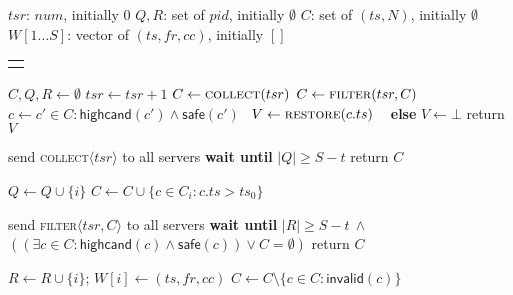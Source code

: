 \documentclass[10pt,conference,compsocconf]{IEEEtran}
\newcommand{\nonce}{N}
\begin{document}
\begin{algo}[t]
\small

\begin{distribalgo}[1] \setcounter{ALC@line}{\value{alg:client1:lines}}
\smallskip
{}
\STATE $tsr$: $num$, initially $0$
\STATE $Q,R$: set of $pid$, initially $\emptyset$
\STATE $C$: set of $(ts, \nonce)$, initially $\emptyset$
\STATE $W[1 \dots S]$: vector of $(ts,fr,cc)$, initially $[]$
\ENDINDENT

\setcounter{alg:client1:lines}{\value{ALC@line}}
\end{distribalgo}
\begin{tabular}{c}\hline\mbox{}\hspace{0.45\textwidth}\mbox{}\end{tabular}
\vspace{-2 em}
\begin{distribalgo}[1]   \setcounter{ALC@line}{\value{alg:client1:lines}}

\STATE $C,Q,R \leftarrow \emptyset$
\STATE $tsr \leftarrow tsr + 1$
\STATE $C \leftarrow \textsc{collect}(tsr)$
\STATE $C \leftarrow \textsc{filter}(tsr, C)$
\STATE $c \leftarrow c' \in C: \textsf{highcand}(c') \wedge \textsf{safe}(c')$~\label{alg:reader:select}
\STATE $V \leftarrow \textsc{restore}(c.ts)$ ~\label{alg:reader:restore}
\ENDIF
\STATE \textbf{else} $V \leftarrow \bot$
\STATE return $V$
\ENDINDENT

\medskip
{}
\STATE send \textsc{collect}$\langle tsr \rangle$ to all servers
\STATE \textbf{wait until} $|Q| \geq S-t$
\STATE return $C$
\ENDINDENT

\smallskip
{}
\STATE $Q \leftarrow Q \cup \{ i \}$
\STATE $C \leftarrow C \cup \{c \in C_i : c.ts > ts_0\}$
\ENDINDENT

\medskip
{}
\STATE send \textsc{filter}$\langle tsr, C \rangle$ to all servers
\STATE \textbf{wait until} $|R| \geq S-t\ \wedge$\\ $((\exists c \in C: \textsf{highcand}(c) \wedge \textsf{safe}(c)) \vee C = \emptyset)$
\STATE return $C$
\ENDINDENT

\smallskip
{}
\STATE $R \leftarrow R \cup \{ i \}$; $W[i] \leftarrow (ts,fr,cc)$
\STATE $C \leftarrow C \setminus \{c \in C: \textsf{invalid}(c) \}$
\ENDINDENT


\end{distribalgo}
\end{algo}
\end{document}
